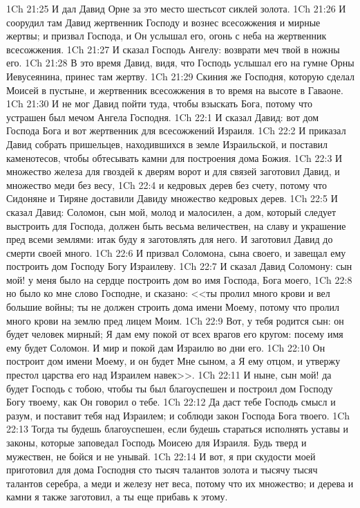 \vs 1Ch 21:25 И дал Давид Орне за это место шестьсот сиклей золота.
\vs 1Ch 21:26 И соорудил там Давид жертвенник Господу и вознес всесожжения и мирные жертвы; и призвал Господа, и Он услышал его,  огонь с неба на жертвенник всесожжения.
\vs 1Ch 21:27 И сказал Господь Ангелу: возврати меч твой в ножны его.
\vs 1Ch 21:28 В это время Давид, видя, что Господь услышал его на гумне Орны Иевусеянина, принес там жертву.
\rsbpar\vs 1Ch 21:29 Скиния же Господня, которую сделал Моисей в пустыне, и жертвенник всесожжения  в то время на высоте в Гаваоне.
\vs 1Ch 21:30 И не мог Давид пойти туда, чтобы взыскать Бога, потому что устрашен был мечом Ангела Господня.
\vs 1Ch 22:1 И сказал Давид: вот дом Господа Бога и вот жертвенник для всесожжений Израиля.
\vs 1Ch 22:2 И приказал Давид собрать пришельцев, находившихся в земле Израильской, и поставил каменотесов, чтобы обтесывать камни для построения дома Божия.
\vs 1Ch 22:3 И множество железа для гвоздей к дверям ворот и для связей заготовил Давид, и множество меди без весу,
\vs 1Ch 22:4 и кедровых дерев без счету, потому что Сидоняне и Тиряне доставили Давиду множество кедровых дерев.
\vs 1Ch 22:5 И сказал Давид: Соломон, сын мой, молод и малосилен, а дом, который следует выстроить для Господа, должен быть весьма величествен, на славу и украшение пред всеми землями: итак буду я заготовлять для него. И заготовил Давид до смерти своей много.
\rsbpar\vs 1Ch 22:6 И призвал Соломона, сына своего, и завещал ему построить дом Господу Богу Израилеву.
\vs 1Ch 22:7 И сказал Давид Соломону: сын мой! у меня было на сердце построить дом во имя Господа, Бога моего,
\vs 1Ch 22:8 но было ко мне слово Господне, и сказано: <<ты пролил много крови и вел большие войны; ты не должен строить дома имени Моему, потому что пролил много крови на землю пред лицем Моим.
\vs 1Ch 22:9 Вот, у тебя родится сын: он будет человек мирный; Я дам ему покой от всех врагов его кругом: посему имя ему будет Соломон. И мир и покой дам Израилю во дни его.
\vs 1Ch 22:10 Он построит дом имени Моему, и он будет Мне сыном, а Я ему отцом, и утвержу престол царства его над Израилем навек>>.
\vs 1Ch 22:11 И ныне, сын мой! да будет Господь с тобою, чтобы ты был благоуспешен и построил дом Господу Богу твоему, как Он говорил о тебе.
\vs 1Ch 22:12 Да даст тебе Господь смысл и разум, и поставит тебя над Израилем; и соблюди закон Господа Бога твоего.
\vs 1Ch 22:13 Тогда ты будешь благоуспешен, если будешь стараться исполнять уставы и законы, которые заповедал Господь Моисею для Израиля. Будь тверд и мужествен, не бойся и не унывай.
\vs 1Ch 22:14 И вот, я при скудости моей приготовил для дома Господня сто тысяч талантов золота и тысячу тысяч талантов серебра, а меди и железу нет веса, потому что их множество; и дерева и камни я также заготовил, а ты еще прибавь к этому.
